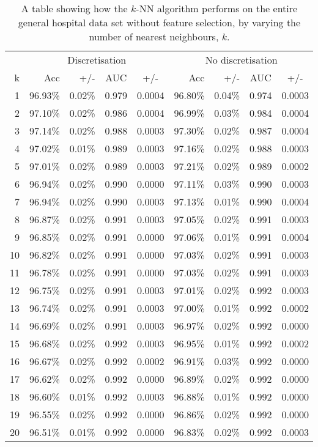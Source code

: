 \begin{table}[htbp]
\caption{A table showing how the $k$-NN algorithm performs on the entire general hospital data set without feature selection, by varying the number of nearest neighbours, $k$.}
\begin{tabular}{|r|rrrr|rrrr|}
\hline
\multicolumn{1}{|l|}{} & \multicolumn{ 4}{c|}{Discretisation} & \multicolumn{ 4}{c|}{No discretisation} \\
k & Acc & +/- & \multicolumn{1}{c}{AUC} & \multicolumn{1}{c|}{+/-} & Acc & +/- & \multicolumn{1}{c}{AUC} & \multicolumn{1}{c|}{+/-} \\ \hline
1 & 96.93\% & 0.02\% & 0.979 & 0.0004 & 96.80\% & 0.04\% & 0.974 & 0.0003 \\ \hline
2 & 97.10\% & 0.02\% & 0.986 & 0.0004 & 96.99\% & 0.03\% & 0.984 & 0.0004 \\ \hline
3 & 97.14\% & 0.02\% & 0.988 & 0.0003 & 97.30\% & 0.02\% & 0.987 & 0.0004 \\ \hline
4 & 97.02\% & 0.01\% & 0.989 & 0.0003 & 97.16\% & 0.02\% & 0.988 & 0.0003 \\ \hline
5 & 97.01\% & 0.02\% & 0.989 & 0.0003 & 97.21\% & 0.02\% & 0.989 & 0.0002 \\ \hline
6 & 96.94\% & 0.02\% & 0.990 & 0.0000 & 97.11\% & 0.03\% & 0.990 & 0.0003 \\ \hline
7 & 96.94\% & 0.02\% & 0.990 & 0.0003 & 97.13\% & 0.01\% & 0.990 & 0.0004 \\ \hline
8 & 96.87\% & 0.02\% & 0.991 & 0.0003 & 97.05\% & 0.02\% & 0.991 & 0.0003 \\ \hline
9 & 96.85\% & 0.02\% & 0.991 & 0.0000 & 97.06\% & 0.01\% & 0.991 & 0.0004 \\ \hline
10 & 96.82\% & 0.02\% & 0.991 & 0.0000 & 97.03\% & 0.02\% & 0.991 & 0.0003 \\ \hline
11 & 96.78\% & 0.02\% & 0.991 & 0.0000 & 97.03\% & 0.02\% & 0.991 & 0.0003 \\ \hline
12 & 96.75\% & 0.02\% & 0.991 & 0.0003 & 97.01\% & 0.02\% & 0.992 & 0.0003 \\ \hline
13 & 96.74\% & 0.02\% & 0.991 & 0.0003 & 97.00\% & 0.01\% & 0.992 & 0.0002 \\ \hline
14 & 96.69\% & 0.02\% & 0.991 & 0.0003 & 96.97\% & 0.02\% & 0.992 & 0.0000 \\ \hline
15 & 96.68\% & 0.02\% & 0.992 & 0.0003 & 96.95\% & 0.01\% & 0.992 & 0.0002 \\ \hline
16 & 96.67\% & 0.02\% & 0.992 & 0.0002 & 96.91\% & 0.03\% & 0.992 & 0.0000 \\ \hline
17 & 96.62\% & 0.02\% & 0.992 & 0.0000 & 96.89\% & 0.02\% & 0.992 & 0.0000 \\ \hline
18 & 96.60\% & 0.01\% & 0.992 & 0.0003 & 96.88\% & 0.01\% & 0.992 & 0.0000 \\ \hline
19 & 96.55\% & 0.02\% & 0.992 & 0.0000 & 96.86\% & 0.02\% & 0.992 & 0.0000 \\ \hline
20 & 96.51\% & 0.01\% & 0.992 & 0.0000 & 96.83\% & 0.02\% & 0.992 & 0.0003 \\ \hline
\end{tabular}
\end{table}
